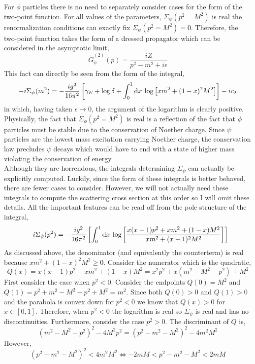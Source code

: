 \documentclass[12pt]{extarticle}
\begin{document}
For $\phi$ particles there is no need to separately consider cases for the form of the two-point function. For all values of the parameters, $\Sigma_\psi(p^2 = M^2)$ is real the renormalization conditions can exactly fix $\Sigma_\psi(p^2 = M^2) = 0$. Therefore, the two-point function takes the form of a dressed propagator which can be considered in the asymptotic limit,
\[ \tilde{G}_\psi^{(2)}(p) = \frac{i Z}{p^2 - m^2 + i \epsilon} \]
This fact can directly be seen from the form of the integral, 
\[ - i \Sigma_\psi(m^2) = -\frac{ig^2}{16 \pi^2} \left[ \gamma_E + \log{\delta} + \int_{0}^{1} \mathrm{d}x \: \log{\left[ x m^2 + (1 - x)^2 M^2 \right]} \right] - i c_2 \]
in which, having taken $\epsilon \to 0$, the argument of the logarithm is clearly positive. Physically, the fact that $\Sigma_\phi(p^2 = M^2)$ is real is a reflection of the fact that $\phi$ particles must be stable due to the conservation of Noether charge. Since $\psi$ particles are the lowest mass excitation carrying Noether charge, the conservation law precludes $\psi$ decays which would have to end with a state of higher mass violating the conservation of energy. \bigskip\\
Although they are horrendous, the integrals determining $\Sigma_\psi$ can actually be explicitly computed. Luckily, since the form of these integrals is better behaved, there are fewer cases to consider. However, we will not actually need these integrals to compute the scattering cross section at this order so I will omit these details. All the important features can be read off from the pole structure of the integral,
\[ - i \Sigma_\psi(p^2) = - \frac{ig^2}{16 \pi^2} \left[ \int_{0}^{1} \mathrm{d}x \: \log{\left[\frac{ x(x - 1) p^2 + x m^2 + (1 - x) M^2}{x m^2 + (x - 1)^2 M^2} \right]} \right] \]
As discussed above, the denominator (and equivalently the counterterm) is real because $x m^2 + (1 - x)^2 M^2 \ge 0$. Consider the numerator which is the quadratic,
\[Q(x) = x(x - 1) p^2 + x m^2 + (1-x)M^2 = x^2 p^2 + x (m^2 - M^2 - p^2) + M^2 \]
First consider the case when $p^2 < 0$. Consider the endpoints $Q(0) = M^2$ and $Q(1) = p^2 + m^2 - M^2 - p^2 + M^2 = m^2$. Since both $Q(0) > 0$ and $Q(1) > 0$ and the parabola is convex down for $p^2 < 0$ we know that $Q(x) > 0$ for $x \in [0,1]$. Therefore, when $p^2 < 0$ the logarithm is real so $\Sigma_\psi$ is real and has no discontinuities. Furthermore, consider the case $p^2 > 0$. The discriminant of $Q$ is,
\[ (m^2 - M^2 - p^2)^2 - 4 M^2 p^2 = (p^2 - m^2 - M^2)^2 - 4 m^2 M^2 \]
However, 
\[ (p^2 - m^2 - M^2)^2 < 4 m^2 M^2 \iff - 2 m M < p^2 - m^2 - M^2 < 2 m M\]
\end{document}
